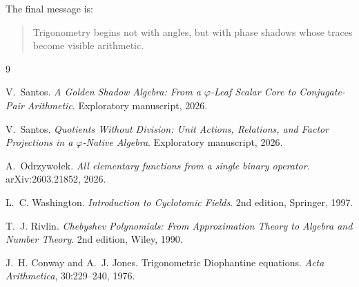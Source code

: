 \documentclass[11pt]{article}
\begin{document}
The final message is:
\begin{quote}
Trigonometry begins not with angles, but with phase shadows whose traces become visible arithmetic.
\end{quote}

\begin{thebibliography}{9}

V.~Santos.
\newblock \emph{A Golden Shadow Algebra: From a $\varphi$-Leaf Scalar Core to Conjugate-Pair Arithmetic}.
\newblock Exploratory manuscript, 2026.

V.~Santos.
\newblock \emph{Quotients Without Division: Unit Actions, Relations, and Factor Projections in a $\varphi$-Native Algebra}.
\newblock Exploratory manuscript, 2026.

A.~Odrzywo\l{}ek.
\newblock \emph{All elementary functions from a single binary operator}.
\newblock arXiv:2603.21852, 2026.

L.~C. Washington.
\newblock \emph{Introduction to Cyclotomic Fields}.
\newblock 2nd edition, Springer, 1997.

T.~J. Rivlin.
\newblock \emph{Chebyshev Polynomials: From Approximation Theory to Algebra and Number Theory}.
\newblock 2nd edition, Wiley, 1990.

J.~H. Conway and A.~J. Jones.
\newblock Trigonometric Diophantine equations.
\newblock \emph{Acta Arithmetica}, 30:229--240, 1976.

\end{thebibliography}
\end{document}
